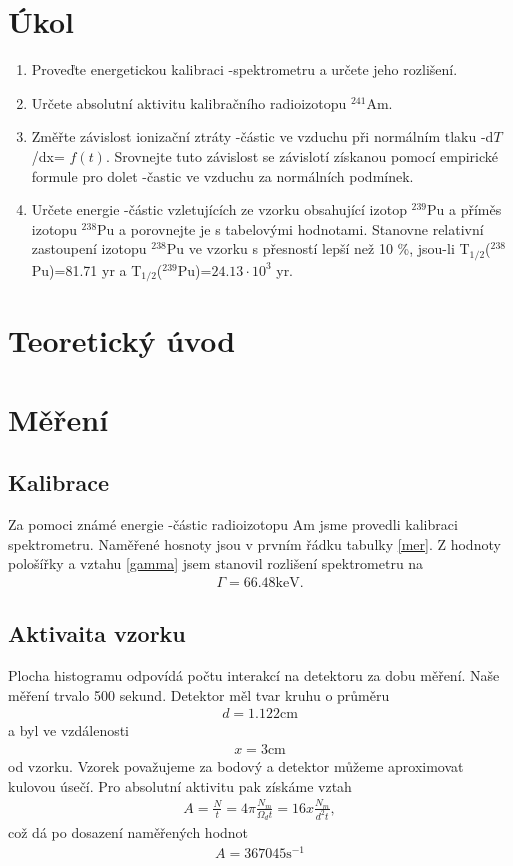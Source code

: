 \documentclass[a4paper,12pt]{article}
\begin{document}
\section{Úkol}
\begin{enumerate}
    \item Proveďte energetickou kalibraci \alpha-spektrometru a určete jeho rozlišení.
    \item Určete absolutní aktivitu kalibračního radioizotopu $^{241}$Am.
    \item Změřte závislost ionizační ztráty \alpha-částic ve vzduchu při normálním 
    tlaku -d$T$/dx= $f(t)$. Srovnejte tuto závislost se závislotí získanou pomocí empirické formule 
    pro dolet \alpha-častic ve vzduchu za normálních podmínek.
    \item Určete energie \alpha-částic vzletujících ze vzorku obsahující izotop $^{239}$Pu a příměs 
    izotopu $^{238}$Pu a porovnejte je s tabelovými hodnotami. Stanovne relativní zastoupení izotopu 
    $^{238}$Pu ve vzorku s přesností lepší než 10 \%, jsou-li T$_{1/2}$($^{238}$Pu)=81.71 yr a 
    T$_{1/2}$($^{239}$Pu)=$24.13\cdot10^3$ yr.
\end{enumerate}

\section{Teoretický úvod}

\section{Měření}
\subsection{Kalibrace}
Za pomoci známé energie \alpha-částic radioizotopu Am jsme provedli kalibraci spektrometru. Naměřené hosnoty jsou v prvním řádku tabulky \ref{mer}. 
Z hodnoty pološířky a vztahu \ref{gamma} jsem stanovil rozlišení spektrometru na
\begin{eqnarray}
\Gamma = 66.48 \mbox{keV}.
\end{eqnarray}

\subsection{Aktivaita vzorku}
Plocha histogramu odpovídá počtu interakcí na detektoru za dobu měření. Naše měření trvalo 500 sekund. Detektor měl tvar kruhu o průměru 
\begin{eqnarray}
d=1.122 \mbox{cm}
\end{eqnarray}
a byl ve vzdálenosti
\begin{eqnarray}
x=3 \mbox{cm}
\end{eqnarray}
od vzorku. Vzorek považujeme za bodový a detektor můžeme aproximovat kulovou úsečí. Pro absolutní aktivitu pak získáme vztah
\begin{eqnarray}
A=\frac{N}{t}=4\pi\frac{N_m}{\Omega_dt}=16x\frac{N_m}{d^2t},
\end{eqnarray}
což dá po dosazení naměřených hodnot
\begin{eqnarray}
A=367045 \mbox{s}^{-1}
\end{eqnarray}
\end{document}
